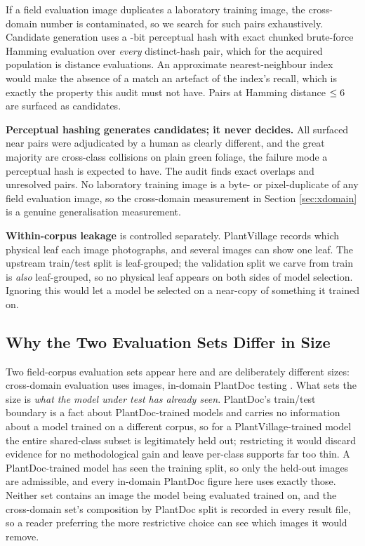 \documentclass[runningheads]{llncs}
\begin{document}
If a field evaluation image duplicates a laboratory training image, the
cross-domain number is contaminated, so we search for such pairs exhaustively.
Candidate generation uses a \PhashBits{}-bit perceptual hash with exact chunked
brute-force Hamming evaluation over \emph{every} distinct-hash pair, which for
the acquired population is \NPhashComparisonsSci{} distance evaluations. An
approximate nearest-neighbour index would make the absence of a match an artefact
of the index's recall, which is exactly the property this audit must not have.
Pairs at Hamming distance $\leq 6{}$ are surfaced as candidates.

\textbf{Perceptual hashing generates candidates; it never decides.} All
\NLeakNearCore{} surfaced near pairs were adjudicated by a human as clearly
different, and the great majority are cross-class collisions on plain green
foliage, the failure mode a perceptual hash is expected to have. The audit
finds \NLeakExactCore{} exact overlaps and \NLeakUnresolved{} unresolved pairs.
No laboratory training image is a byte- or pixel-duplicate of any field
evaluation image, so the cross-domain measurement in Section \ref{sec:xdomain}
is a genuine generalisation measurement.

\textbf{Within-corpus leakage} is controlled separately. PlantVillage records
which physical leaf each image photographs, and several images can show one
leaf. The upstream train/test split is leaf-grouped; the validation split we
carve from train is \emph{also} leaf-grouped, so no physical leaf appears on
both sides of model selection. Ignoring this would let a model be selected on a
near-copy of something it trained on.

\subsection{Why the Two Evaluation Sets Differ in Size}
\label{sec:two-eval-sets}

Two field-corpus evaluation sets appear here and are deliberately different
sizes: cross-domain evaluation uses \NXdImages{} images, in-domain PlantDoc
testing \NPdcTest{}. What sets the size is \emph{what the model under test has
already seen}. PlantDoc's train/test boundary is a fact about PlantDoc-trained
models and carries no information about a model trained on a different corpus,
so for a PlantVillage-trained model the entire shared-class subset is
legitimately held out; restricting it would discard evidence for no
methodological gain and leave per-class supports far too thin. A
PlantDoc-trained model has seen the training split, so only the \NPdcTest{}
held-out images are admissible, and every in-domain PlantDoc figure here uses
exactly those. Neither set contains an image the model being evaluated trained
on, and the cross-domain set's composition by PlantDoc split is recorded in every
result file, so a reader preferring the more restrictive choice can see which
images it would remove.
\end{document}
